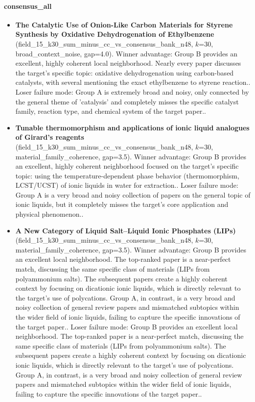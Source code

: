 \paragraph{consensus\_all}
\begin{itemize}
\item \textbf{The Catalytic Use of Onion-Like Carbon Materials for Styrene Synthesis by Oxidative Dehydrogenation of Ethylbenzene} (field\_15\_k30\_sum\_minus\_cc\_vs\_consensus\_bank\_n48, $k$=30, broad\_context\_noise, gap=4.0). Winner advantage: Group B provides an excellent, highly coherent local neighborhood. Nearly every paper discusses the target's specific topic: oxidative dehydrogenation using carbon-based catalysts, with several mentioning the exact ethylbenzene to styrene reaction.. Loser failure mode: Group A is extremely broad and noisy, only connected by the general theme of 'catalysis' and completely misses the specific catalyst family, reaction type, and chemical system of the target paper..
\item \textbf{Tunable thermomorphism and applications of ionic liquid analogues of Girard's reagents} (field\_15\_k30\_sum\_minus\_cc\_vs\_consensus\_bank\_n48, $k$=30, material\_family\_coherence, gap=3.5). Winner advantage: Group B provides an excellent, highly coherent neighborhood focused on the target's specific topic: using the temperature-dependent phase behavior (thermomorphism, LCST/UCST) of ionic liquids in water for extraction.. Loser failure mode: Group A is a very broad and noisy collection of papers on the general topic of ionic liquids, but it completely misses the target's core application and physical phenomenon..
\item \textbf{A New Category of Liquid Salt--Liquid Ionic Phosphates (LIPs)} (field\_15\_k30\_sum\_minus\_cc\_vs\_consensus\_bank\_n48, $k$=30, material\_family\_coherence, gap=3.5). Winner advantage: Group B provides an excellent local neighborhood. The top-ranked paper is a near-perfect match, discussing the same specific class of materials (LIPs from polyammonium salts). The subsequent papers create a highly coherent context by focusing on dicationic ionic liquids, which is directly relevant to the target's use of polycations. Group A, in contrast, is a very broad and noisy collection of general review papers and mismatched subtopics within the wider field of ionic liquids, failing to capture the specific innovations of the target paper.. Loser failure mode: Group B provides an excellent local neighborhood. The top-ranked paper is a near-perfect match, discussing the same specific class of materials (LIPs from polyammonium salts). The subsequent papers create a highly coherent context by focusing on dicationic ionic liquids, which is directly relevant to the target's use of polycations. Group A, in contrast, is a very broad and noisy collection of general review papers and mismatched subtopics within the wider field of ionic liquids, failing to capture the specific innovations of the target paper..

\end{itemize}
